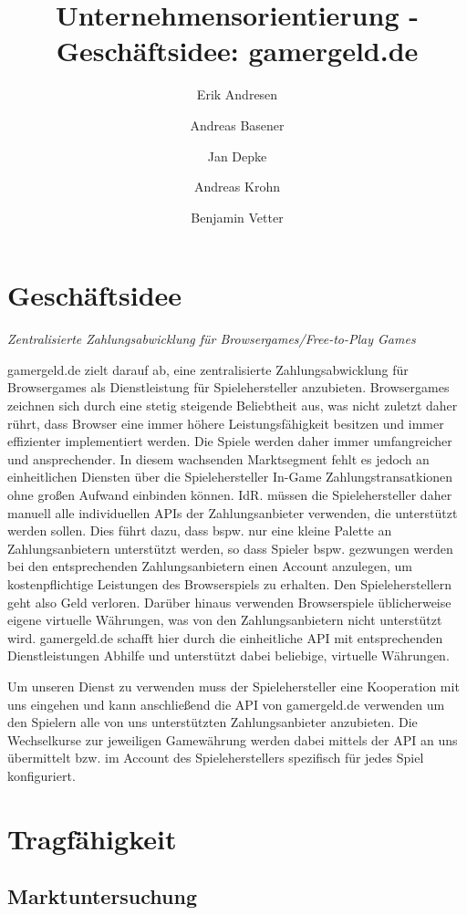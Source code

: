 \documentclass[a4paper,10pt]{article}
\title{Unternehmensorientierung - Geschäftsidee: gamergeld.de}
\author{Erik Andresen \and Andreas Basener \and Jan Depke \and Andreas Krohn \and Benjamin Vetter}
\begin{document}
\maketitle

\section{Geschäftsidee}
\emph{Zentralisierte Zahlungsabwicklung für Browsergames/Free-to-Play Games}

gamergeld.de zielt darauf ab, eine zentralisierte Zahlungsabwicklung für
Browsergames als Dienstleistung für Spielehersteller anzubieten.  Browsergames
zeichnen sich durch eine stetig steigende Beliebtheit aus, was nicht zuletzt
daher rührt, dass Browser eine immer höhere Leistungsfähigkeit besitzen und
immer effizienter implementiert werden. Die Spiele werden daher immer
umfangreicher und ansprechender. In diesem wachsenden Marktsegment fehlt es
jedoch an einheitlichen Diensten über die Spielehersteller In-Game
Zahlungstransatkionen ohne großen Aufwand einbinden können. IdR. müssen die
Spielehersteller daher manuell alle individuellen APIs der Zahlungsanbieter
verwenden, die unterstützt werden sollen. Dies führt dazu, dass bspw. nur eine
kleine Palette an Zahlungsanbietern unterstützt werden, so dass Spieler bspw.
gezwungen werden bei den entsprechenden Zahlungsanbietern einen Account
anzulegen, um kostenpflichtige Leistungen des Browserspiels zu erhalten. Den
Spieleherstellern geht also Geld verloren.  Darüber hinaus verwenden
Browserspiele üblicherweise eigene virtuelle Währungen, was von den
Zahlungsanbietern nicht unterstützt wird.  gamergeld.de schafft hier durch die
einheitliche API mit entsprechenden Dienstleistungen Abhilfe und unterstützt
dabei beliebige, virtuelle Währungen.

Um unseren Dienst zu verwenden muss der Spielehersteller eine Kooperation mit
uns eingehen und kann anschließend die API von gamergeld.de verwenden um den
Spielern alle von uns unterstützten Zahlungsanbieter anzubieten. Die
Wechselkurse zur jeweiligen Gamewährung werden dabei mittels der API an uns
übermittelt bzw. im Account des Spieleherstellers spezifisch für jedes Spiel
konfiguriert.

\section{Tragfähigkeit}\label{labelTragfaehigkeit}

\subsection{Marktuntersuchung}\label{labelMarktuntersuchung}

\end{document}

